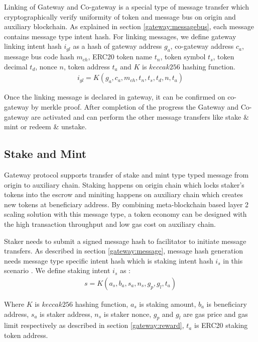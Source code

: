 \documentclass[12pt,a4paper]{article}
\begin{document}
 Linking of Gateway and Co-gateway is a special type of message transfer which cryptographically verify uniformity of token and message bus on origin and auxiliary blockchain. 
 As explained in section \ref{gateway:messagebus}, each message contains message type intent hash. 
 For linking messages, we define gateway linking intent hash $i_{gl}$ as a hash of gateway address $g_a$, co-gateway address $c_a$, message bus code hash $m_{ch}$, ERC20 token name $t_n$, token symbol $t_s$, token decimal $t_d$, nonce $n$, token address $t_a$ and $K$ is $keccak256$ hashing function.
 \begin{align}
i_{gl}  =K(g_a, c_a, m_{ch}, t_n, t_s, t_d, n, t_a) 	
 \end{align}

Once the linking message is declared in gateway, it can be confirmed on co-gateway by merkle proof. 
After completion of the progress the Gateway and Co-gateway are activated and can perform the other message transfers like stake \& mint or redeem \& unstake. 

\subsection{Stake and Mint}\label{gateway:stakemint}
Gateway protocol supports transfer of stake and mint type typed message from origin to auxiliary chain. 
Staking happens on origin chain which locks staker’s tokens into the escrow and miniting happens on auxiliary chain which creates new tokens at beneficiary address. 
By combining meta-blockchain based layer 2 scaling solution with this message type, a token economy can be designed with the high transaction throughput and low gas cost on auxiliary chain.

Staker needs to submit a signed message hash to facilitator to initiate message transfers. 
As described in section \ref{gateway:message}, message hash generation needs message type specific intent hash which is staking intent hash $i_s$ in this scenario . We define staking intent $i_s$  as : 
 \begin{align}
 	s = K(a_s,b_a,s_a,n_s,g_p,g_l,t_a )
 \end{align}
                                                       
Where $K$ is $keccak256$ hashing function, $a_s$ is staking amount, $b_a$ is beneficiary address, $s_a$ is staker address, $n_s$ is staker nonce, $g_p$ and $g_l$ are gas price and gas limit respectively as described in section \ref{gateway:reward}, $t_a$ is ERC20 staking token address. 
\end{document}
